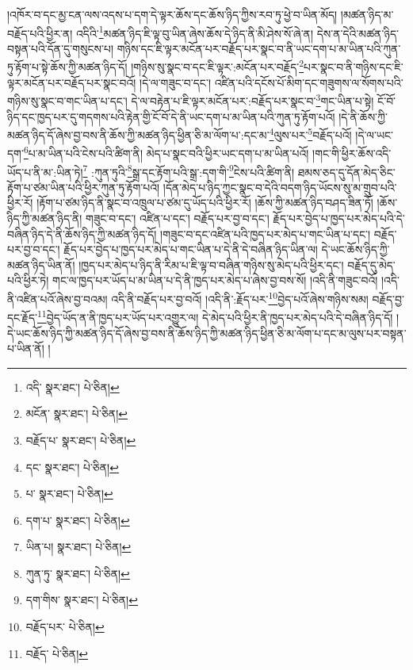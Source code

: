 །འཁོར་བ་དང་མྱ་ངན་ལས་འདས་པ་དག་དེ་ལྟར་ཆོས་དང་ཆོས་ཉིད་ཀྱིས་རབ་ཏུ་ཕྱེ་བ་ཡིན་མོད། །མཚན་ཉིད་མ་བརྗོད་པའི་ཕྱིར་ན། འདིའི་\footnote{འདི་  སྣར་ཐང་།  པེ་ཅིན། }མཚན་ཉིད་ཇི་ལྟ་བུ་ཡིན་ཞེས་ཆོས་དེ་ཉིད་ནི་མི་ཤེས་སོ་ཞེ་ན། དེས་ན་དེའི་མཚན་ཉིད་བསྟན་པའི་དོན་དུ་གསུངས་པ། གཉིས་དང་ཇི་ལྟར་མངོན་པར་བརྗོད་པར་སྣང་བ་ནི་ཡང་དག་པ་མ་ཡིན་པའི་ཀུན་ཏུ་རྟོག་པ་སྟེ་ཆོས་ཀྱི་མཚན་ཉིད་དོ། །གཉིས་སུ་སྣང་བ་དང་ཇི་ལྟར་:མངོན་པར་བརྗོད་\footnote{མངོན་  སྣར་ཐང་།  པེ་ཅིན། }པར་སྣང་བ་ནི་གཉིས་དང་ཇི་ལྟར་མངོན་པར་བརྗོད་པར་སྣང་བའོ། །དེ་ལ་གཟུང་བ་དང་། འཛིན་པའི་དངོས་པོ་མིག་དང་གཟུགས་ལ་སོགས་པའི་གཉིས་སུ་སྣང་བ་གང་ཡིན་པ་དང་། དེ་ལ་བརྟེན་པ་ཇི་ལྟར་མངོན་པར་:བརྗོད་པར་སྣང་བ་\footnote{བརྗོད་པ་  སྣར་ཐང་།  པེ་ཅིན། }གང་ཡིན་པ་སྟེ། ངོ་བོ་ཉིད་དང་ཁྱད་པར་དུ་གདགས་པའི་རྟེན་གྱི་ངོ་བོ་དེ་ནི་ཡང་དག་པ་མ་ཡིན་པའི་ཀུན་ཏུ་རྟོག་པའོ། །དེ་ནི་ཆོས་ཀྱི་མཚན་ཉིད་དོ་ཞེས་བྱ་བས་ནི་ཆོས་ཀྱི་མཚན་ཉིད་ཕྱིན་ཅི་མ་ལོག་པ་:དང་མ་\footnote{དང་  སྣར་ཐང་།  པེ་ཅིན། }ལུས་པར་\footnote{པ་  སྣར་ཐང་།  པེ་ཅིན། }བརྗོད་པའོ། །དེ་ལ་ཡང་དག་\footnote{དག་པ་  སྣར་ཐང་།  པེ་ཅིན། }པ་མ་ཡིན་པའི་ངེས་པའི་ཚིག་ནི། མེད་པ་སྣང་བའི་ཕྱིར་ཡང་དག་པ་མ་ཡིན་པའོ། །གང་གི་ཕྱིར་ཆོས་འདི་ཡོད་པ་ནི་མ་:ཡིན་ཏེ།\footnote{ཡིན་པ།  སྣར་ཐང་།  པེ་ཅིན། } :ཀུན་ཏུའི་\footnote{ཀུན་ཏུ་  སྣར་ཐང་།  པེ་ཅིན། }སྒྲ་དང་རྟོག་པའི་སྒྲ་:དག་གི་\footnote{དག་གིས་  སྣར་ཐང་།  པེ་ཅིན། }ངེས་པའི་ཚིག་ནི། ཐམས་ཅད་དུ་དོན་མེད་ཅིང་རྟོག་པ་ཙམ་ཡིན་པའི་ཕྱིར་ཀུན་ཏུ་རྟོག་པའོ། །དོན་མེད་པ་ཉིད་ཀྱང་སྣང་བ་དེའི་བདག་ཉིད་ཡོངས་སུ་མ་གྲུབ་པའི་ཕྱིར་རོ། །རྟོག་པ་ཙམ་ཉིད་ནི་སྣང་བ་འཁྲུལ་པ་ཙམ་དུ་ཡོད་པའི་ཕྱིར་རོ། །ཆོས་ཀྱི་མཚན་ཉིད་བཤད་ཟིན་ཏོ། །ཆོས་ཉིད་ཀྱི་མཚན་ཉིད་ནི། གཟུང་བ་དང་། འཛིན་པ་དང་། བརྗོད་པར་བྱ་བ་དང་། རྗོད་པར་བྱེད་པ་ཁྱད་པར་མེད་པའི་དེ་བཞིན་ཉིད་དེ་ནི་ཆོས་ཉིད་ཀྱི་མཚན་ཉིད་དོ། །གཟུང་བ་དང་འཛིན་པའི་ཁྱད་པར་མེད་པ་གང་ཡིན་པ་དང་། བརྗོད་པར་བྱ་བ་དང་། རྗོད་པར་བྱེད་པ་ཁྱད་པར་མེད་པ་གང་ཡིན་པ་དེ་ནི་དེ་བཞིན་ཉིད་ཡིན་ལ། དེ་ཡང་ཆོས་ཉིད་ཀྱི་མཚན་ཉིད་ཡིན་ནོ། །ཁྱད་པར་མེད་པ་ཉིད་ནི་རིམ་པ་ཇི་ལྟ་བ་བཞིན་གཉིས་སུ་མེད་པའི་ཕྱིར་དང་། བརྗོད་དུ་མེད་པའི་ཕྱིར་ཏེ། གང་ལ་ཁྱད་པར་ཡོད་པ་མ་ཡིན་པ་དེ་ནི་ཁྱད་པར་མེད་པ་ཞེས་བྱ་བས་སོ། །འདི་ནི་གཟུང་བའོ། །འདི་ནི་འཛིན་པའོ་ཞེས་བྱ་བའམ། འདི་ནི་བརྗོད་པར་བྱ་བའོ། །འདི་ནི་:རྗོད་པར་\footnote{བརྗོད་པར་  པེ་ཅིན། }བྱེད་པའོ་ཞེས་གཉིས་སམ། བརྗོད་བྱ་དང་རྗོད་\footnote{བརྗོད་  པེ་ཅིན། }བྱེད་ཡོད་ན་ནི་ཁྱད་པར་ཡོད་པར་འགྱུར་ལ། དེ་མེད་པའི་ཕྱིར་ནི་ཁྱད་པར་མེད་པའི་དེ་བཞིན་ཉིད་དོ། །དེ་ཡང་ཆོས་ཉིད་ཀྱི་མཚན་ཉིད་དོ་ཞེས་བྱ་བས་ནི་ཆོས་ཉིད་ཀྱི་མཚན་ཉིད་ཕྱིན་ཅི་མ་ལོག་པ་དང་མ་ལུས་པར་བསྟན་པ་ཡིན་ནོ། །
